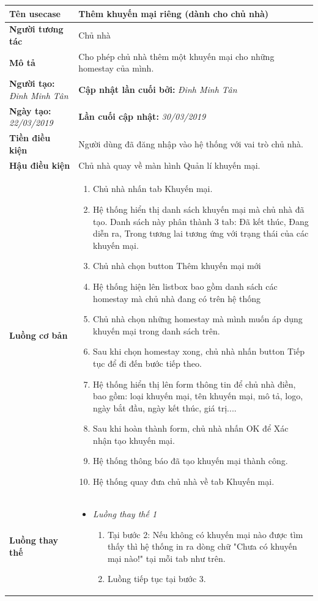\begin{center}
	\begin{longtable}{ | l |p{10cm}|}
		\hline
		\textbf{Tên usecase} & Thêm khuyến mại riêng (dành cho chủ nhà) \\ \hline
		\textbf{Người tương tác} & Chủ nhà \\ \hline   
		\textbf{Mô tả} & Cho phép chủ nhà thêm một khuyến mại cho những homestay của mình. \\ \hline  
		\textbf{Người tạo:} \textit{Đinh Minh Tân} & \textbf{Cập nhật lần cuối bởi:} \textit{Đinh Minh Tân} \\ \hline
		\textbf{Ngày tạo:} \textit{22/03/2019} & \textbf{Lần cuối cập nhật:} \textit{30/03/2019} \\ \hline
		\textbf{Tiền điều kiện} & Người dùng đã đăng nhập vào hệ thống với vai trò chủ nhà.  \\ \hline 
		\textbf{Hậu điều kiện} & Chủ nhà quay về màn hình Quản lí khuyến mại. \\ \hline 
		\textbf{Luồng cơ bản} & 
		\begin{enumerate}
			\item Chủ nhà nhấn tab Khuyến mại.
			\item Hệ thống hiển thị danh sách khuyến mại mà chủ nhà đã tạo. Danh sách này phân thành 3 tab: Đã kết thúc, Đang diễn ra, Trong tương lai tương ứng với trạng thái của các khuyến mại.
			\item Chủ nhà chọn button Thêm khuyến mại mới 
			\item Hệ thống hiện lên listbox bao gồm danh sách các homestay mà chủ nhà đang có trên hệ thống
			\item Chủ nhà chọn những homestay mà mình muốn áp dụng khuyến mại trong danh sách trên.
			\item Sau khi chọn homestay xong, chủ nhà nhấn button Tiếp tục để đi đến bước tiếp theo.
			\item Hệ thống hiển thị lên form thông tin để chủ nhà điền, bao gồm: loại khuyến mại, tên khuyến mại, mô tả, logo, ngày bắt đầu, ngày kết thúc, giá trị....
			\item Sau khi hoàn thành form, chủ nhà nhấn OK để Xác nhận tạo khuyến mại.
			\item Hệ thống thông báo đã tạo khuyến mại thành công.
			\item Hệ thống quay đưa chủ nhà về tab Khuyến mại.
		\end{enumerate} \\ \hline 
		\textbf{Luồng thay thế} & 
		\begin{itemize} 
			\item \textit{Luồng thay thế 1}
			\begin{enumerate}
				\item Tại bước 2: Nếu không có khuyến mại nào được tìm thấy thì hệ thống in ra dòng chữ "Chưa có khuyến mại nào!" tại mỗi tab như trên.
				\item Luồng tiếp tục tại bước 3. 
			\end{enumerate}
			

\end{itemize}
\end{longtable}
\end{center}
